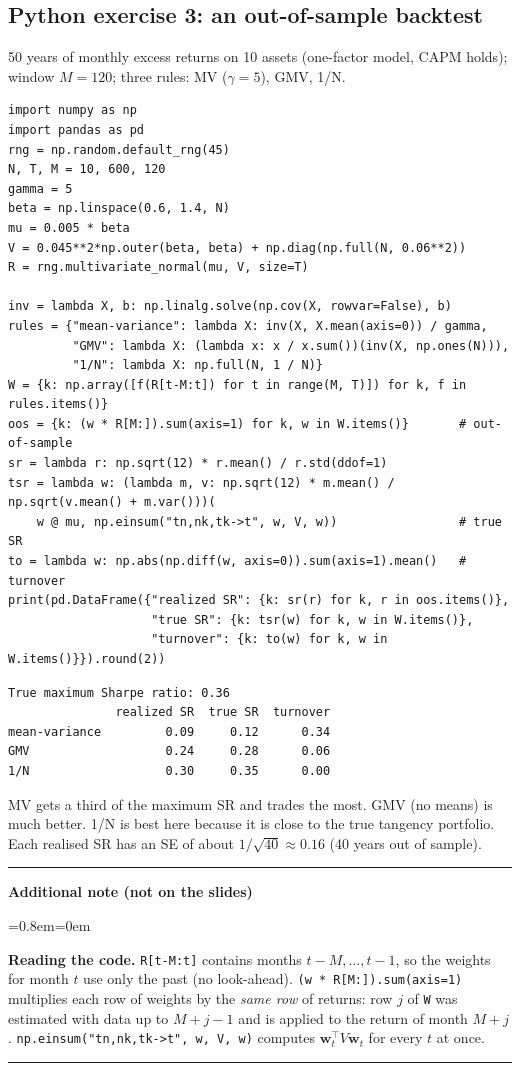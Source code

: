 \documentclass[11pt,a4paper]{report}
\newenvironment{notebox}[1]
  {\par\medskip\Needspace{6\baselineskip}\noindent\rule{\linewidth}{0.4pt}\par\nopagebreak
   \noindent\textbf{#1}\par\nopagebreak
   \begin{list}{}{\leftmargin=0.8em\rightmargin=0em\topsep=2pt}\item[]}
  {\end{list}\nopagebreak\noindent\rule{\linewidth}{0.4pt}\par\medskip}
\newenvironment{addnote}{\begin{notebox}{Additional note (not on the slides)}}{\end{notebox}}
\newcommand{\w}{\bm{w}}
\newcommand{\T}{^{\top}}
\begin{document}
\subsection*{Python exercise 3: an out-of-sample backtest}
50 years of monthly excess returns on 10 assets (one-factor model, CAPM holds);
window $M=120$; three rules: MV ($\gamma=5$), GMV, 1/N.
\begin{lstlisting}
import numpy as np
import pandas as pd
rng = np.random.default_rng(45)
N, T, M = 10, 600, 120
gamma = 5
beta = np.linspace(0.6, 1.4, N)
mu = 0.005 * beta
V = 0.045**2*np.outer(beta, beta) + np.diag(np.full(N, 0.06**2))
R = rng.multivariate_normal(mu, V, size=T)

inv = lambda X, b: np.linalg.solve(np.cov(X, rowvar=False), b)
rules = {"mean-variance": lambda X: inv(X, X.mean(axis=0)) / gamma,
         "GMV": lambda X: (lambda x: x / x.sum())(inv(X, np.ones(N))),
         "1/N": lambda X: np.full(N, 1 / N)}
W = {k: np.array([f(R[t-M:t]) for t in range(M, T)]) for k, f in rules.items()}
oos = {k: (w * R[M:]).sum(axis=1) for k, w in W.items()}       # out-of-sample
sr = lambda r: np.sqrt(12) * r.mean() / r.std(ddof=1)
tsr = lambda w: (lambda m, v: np.sqrt(12) * m.mean() / np.sqrt(v.mean() + m.var()))(
    w @ mu, np.einsum("tn,nk,tk->t", w, V, w))                 # true SR
to = lambda w: np.abs(np.diff(w, axis=0)).sum(axis=1).mean()   # turnover
print(pd.DataFrame({"realized SR": {k: sr(r) for k, r in oos.items()},
                    "true SR": {k: tsr(w) for k, w in W.items()},
                    "turnover": {k: to(w) for k, w in W.items()}}).round(2))
\end{lstlisting}
\begin{lstlisting}[style=out]
True maximum Sharpe ratio: 0.36
               realized SR  true SR  turnover
mean-variance         0.09     0.12      0.34
GMV                   0.24     0.28      0.06
1/N                   0.30     0.35      0.00
\end{lstlisting}
MV gets a third of the maximum SR and trades the most. GMV (no means) is much
better. 1/N is best here because it is close to the true tangency portfolio.
Each realised SR has an SE of about $1/\sqrt{40}\approx0.16$ (40 years out of sample).
\begin{addnote}
\textbf{Reading the code.} \texttt{R[t-M:t]} contains months $t-M,\dots,t-1$, so
the weights for month $t$ use only the past (no look-ahead). \texttt{(w * R[M:]).sum(axis=1)}
multiplies each row of weights by the \emph{same row} of returns: row $j$ of
\texttt{W} was estimated with data up to $M+j-1$ and is applied to the return of
month $M+j$. \texttt{np.einsum("tn,nk,tk->t", w, V, w)} computes $\w_t\T V\w_t$
for every $t$ at once.
\end{addnote}
\end{document}
